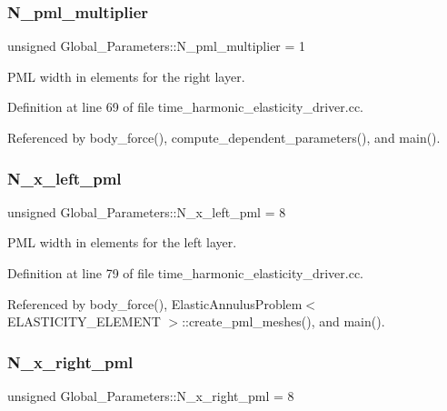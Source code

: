 \subsubsection{\texorpdfstring{N\+\_\+pml\+\_\+multiplier}{N\_pml\_multiplier}}
{\footnotesize\ttfamily unsigned Global\+\_\+\+Parameters\+::\+N\+\_\+pml\+\_\+multiplier = 1}



P\+ML width in elements for the right layer. 



Definition at line 69 of file time\+\_\+harmonic\+\_\+elasticity\+\_\+driver.\+cc.



Referenced by body\+\_\+force(), compute\+\_\+dependent\+\_\+parameters(), and main().

\mbox{\label{namespaceGlobal__Parameters_accf11b5794502b15efd0aa37347f6994}} 
\subsubsection{\texorpdfstring{N\+\_\+x\+\_\+left\+\_\+pml}{N\_x\_left\_pml}}
{\footnotesize\ttfamily unsigned Global\+\_\+\+Parameters\+::\+N\+\_\+x\+\_\+left\+\_\+pml = 8}



P\+ML width in elements for the left layer. 



Definition at line 79 of file time\+\_\+harmonic\+\_\+elasticity\+\_\+driver.\+cc.



Referenced by body\+\_\+force(), Elastic\+Annulus\+Problem$<$ E\+L\+A\+S\+T\+I\+C\+I\+T\+Y\+\_\+\+E\+L\+E\+M\+E\+N\+T $>$\+::create\+\_\+pml\+\_\+meshes(), and main().

\mbox{\label{namespaceGlobal__Parameters_a401ab27b40efe725bc047909ae65b4b1}} 
\subsubsection{\texorpdfstring{N\+\_\+x\+\_\+right\+\_\+pml}{N\_x\_right\_pml}}
{\footnotesize\ttfamily unsigned Global\+\_\+\+Parameters\+::\+N\+\_\+x\+\_\+right\+\_\+pml = 8}



